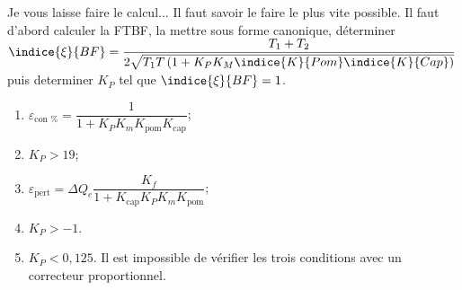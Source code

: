 \ifprof
Je vous laisse faire le calcul... Il faut savoir le faire le plus vite possible.
Il faut d'abord calculer la FTBF, la mettre sous forme canonique, déterminer 
$\indice{\xi}{BF}=\dfrac{T_1+T_2}{2\sqrt{T_1T\left( 1+K_P K_M \indice{K}{Pom}\indice{K}{Cap}\right)}}$ puis
determiner $K_P$ tel que $\indice{\xi}{BF}=1$.

\else 
\fi
 

\ifprof
\else
\ifcolle
\else
\begin{solution}
\begin{enumerate}
  \item $\varepsilon_{\text{con \%}} = \dfrac{1}{1+K_PK_m K_{\text{pom}} K_{\text{cap}} }$;
  \item $K_P > 19$;
  \item $\varepsilon_{\text{pert}} = \Delta Q_e \dfrac{K_f}{1+K_{\text{cap}}K_PK_mK_{\text{pom}}}$;
  \item $K_P > -1$.%
  \item $K_P < 0,125$. Il est impossible de vérifier les trois conditions avec un correcteur proportionnel.
\end{enumerate}
\end{solution}
\fi
{}

\fi